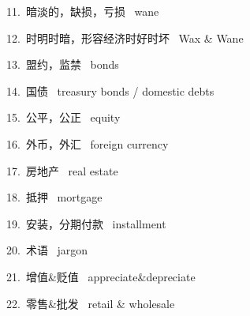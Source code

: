\documentclass[a4paper, 12pt]{article}
\begin{document}
\begin{multicols}{2}
\begin{flushleft}
11.\ 暗淡的，缺损，亏损 \ wane
\end{flushleft}

\begin{flushleft}
12.\ 时明时暗，形容经济时好时坏 \ Wax \& Wane
\end{flushleft}
\end{multicols}

\begin{multicols}{2}
\begin{flushleft}
13.\ 盟约，监禁 \ bonds
\end{flushleft}

\begin{flushleft}
14.\ 国债 \ treasury bonds / domestic debts
\end{flushleft}
\end{multicols}

\begin{multicols}{2}
\begin{flushleft}
15.\ 公平，公正 \ equity
\end{flushleft}

\begin{flushleft}
16.\ 外币，外汇 \ foreign currency
\end{flushleft}
\end{multicols}

\begin{multicols}{2}
\begin{flushleft}
17.\ 房地产 \ real estate
\end{flushleft}

\begin{flushleft}
18.\ 抵押 \ mortgage
\end{flushleft}
\end{multicols}

\begin{multicols}{2}
\begin{flushleft}
19.\ 安装，分期付款 \ installment
\end{flushleft}

\begin{flushleft}
20.\ 术语 \ jargon
\end{flushleft}
\end{multicols}

\begin{multicols}{2}
\begin{flushleft}
21.\ 增值\&贬值 \ appreciate\&depreciate
\end{flushleft}

\begin{flushleft}
22.\ 零售\&批发 \ retail \& wholesale
\end{flushleft}
\end{multicols}
\end{document}

